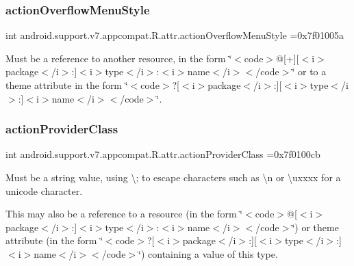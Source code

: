 \subsubsection{\texorpdfstring{action\+Overflow\+Menu\+Style}{actionOverflowMenuStyle}}
{\footnotesize\ttfamily int android.\+support.\+v7.\+appcompat.\+R.\+attr.\+action\+Overflow\+Menu\+Style =0x7f01005a\hspace{0.3cm}{\ttfamily [static]}}

Must be a reference to another resource, in the form \char`\"{}$<$code$>$@\mbox{[}+\mbox{]}\mbox{[}$<$i$>$package$<$/i$>$\+:\mbox{]}$<$i$>$type$<$/i$>$\+:$<$i$>$name$<$/i$>$$<$/code$>$\char`\"{} or to a theme attribute in the form \char`\"{}$<$code$>$?\mbox{[}$<$i$>$package$<$/i$>$\+:\mbox{]}\mbox{[}$<$i$>$type$<$/i$>$\+:\mbox{]}$<$i$>$name$<$/i$>$$<$/code$>$\char`\"{}. \mbox{\label{classandroid_1_1support_1_1v7_1_1appcompat_1_1R_1_1attr_a1f37130cb6f2657163219c2ee7e10c99}} 
\subsubsection{\texorpdfstring{action\+Provider\+Class}{actionProviderClass}}
{\footnotesize\ttfamily int android.\+support.\+v7.\+appcompat.\+R.\+attr.\+action\+Provider\+Class =0x7f0100cb\hspace{0.3cm}{\ttfamily [static]}}

Must be a string value, using \textquotesingle{}\textbackslash{};\textquotesingle{} to escape characters such as \textquotesingle{}\textbackslash{}n\textquotesingle{} or \textquotesingle{}\textbackslash{}uxxxx\textquotesingle{} for a unicode character. 

This may also be a reference to a resource (in the form \char`\"{}$<$code$>$@\mbox{[}$<$i$>$package$<$/i$>$\+:\mbox{]}$<$i$>$type$<$/i$>$\+:$<$i$>$name$<$/i$>$$<$/code$>$\char`\"{}) or theme attribute (in the form \char`\"{}$<$code$>$?\mbox{[}$<$i$>$package$<$/i$>$\+:\mbox{]}\mbox{[}$<$i$>$type$<$/i$>$\+:\mbox{]}$<$i$>$name$<$/i$>$$<$/code$>$\char`\"{}) containing a value of this type. \mbox{\label{classandroid_1_1support_1_1v7_1_1appcompat_1_1R_1_1attr_a6d5e3aa635822a1187f7a25addca2321}} 
